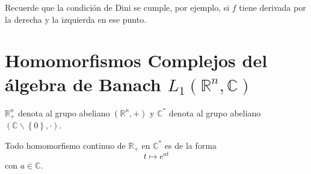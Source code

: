\documentclass[12pt]{report}
\theoremstyle{largebreak}
\begin{document}
    \begin{obs}
        Recuerde que la condición de Dini se cumple, por ejemplo, si $f$ tiene derivada por la derecha y la izquierda en ese punto.
    \end{obs}

    \section{Homomorfismos Complejos del álgebra de Banach $L_1(\mathbb{R}^n,\mathbb{C} )$}

    \begin{obs}
        $\mathbb{R}^n_+$ denota al grupo abeliano $(\mathbb{R}^n,+)$ y $\mathbb{C}^*$ denota al grupo abeliano $(\mathbb{C}\backslash\left\{0\right\},\cdot)$.
    \end{obs}

    \begin{propo}
        Todo homomorfismo continuo de $\mathbb{R}_+$ en $\mathbb{C}^*$ es de la forma
        \begin{equation*}
            t\mapsto e^{ at}
        \end{equation*}
        con $a\in\mathbb{C}$.
    \end{propo}
\end{document}
